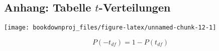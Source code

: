 \documentclass[
  ngerman,
]{article}
\begin{document}
\pagebreak

\hypertarget{anhang-tabelle-t-verteilungen}{%
\subsection{\texorpdfstring{Anhang: Tabelle \(t\)-Verteilungen}{Anhang: Tabelle t-Verteilungen}}\label{anhang-tabelle-t-verteilungen}}

\begin{multicols}{2}
\vfill


\begin{center}\texttt{[image: bookdownproj\_files/figure-latex/unnamed-chunk-12-1]} \end{center}
\vfill
\columnbreak
\vfill
\[ P(-t_{df})= 1 - P(t_{df}) \]
\vfill
\end{multicols}
\end{document}
